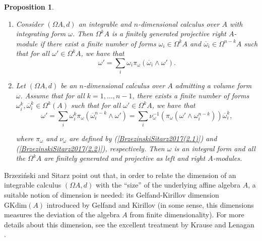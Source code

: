 \documentclass{amsart}
\newtheorem{proposition}[theorem]{Proposition}
\theoremstyle{definition}
\theoremstyle{remark}
\numberwithin{equation}{section}
\begin{document}
\begin{proposition}\label{BrzezinskiSitarz2017Lemmas2.6and2.7}
\begin{enumerate}
\item [\rm (1)] \cite[Lemma 2.6]{BrzezinskiSitarz2017} Consider $(\Omega A, d)$ an integrable and $n$-dimensional calculus over $A$ with integrating form $\omega$. Then $\Omega^{k} A$ is a finitely generated projective right $A$-module if there exist a finite number of forms $\omega_i \in \Omega^{k} A$ and $\overline{\omega}_i \in \Omega^{n-k} A$ such that for all $\omega' \in \Omega^{k} A$, we have that 
\begin{equation*}
\omega' = \sum_{i} \omega_i \pi_{\omega} (\overline{\omega}_i \wedge \omega').
\end{equation*}

\item [\rm (2)] \cite[Lemma 2.7]{BrzezinskiSitarz2017} Let $(\Omega A, d)$ be an $n$-dimensional calculus over $A$ admitting a volume form $\omega$. Assume that for all $k = 1, \ldots, n-1$, there exists a finite number of forms $\omega_{i}^{k},\overline{\omega}_{i}^{k} \in \Omega^{k}(A)$ such that for all $\omega'\in \Omega^kA$, we have that
\begin{equation*}
\omega'=\displaystyle\sum_i\omega_{i}^{k}\pi_\omega(\overline{\omega}_{i}^{n-k}\wedge\omega')=\displaystyle\sum_i\nu_{\omega}^{-1}(\pi_\omega(\omega'\wedge\omega_{i}^{n-k}))\overline{\omega}_{i}^{k},
\end{equation*}

where $\pi_{\omega}$ and $\nu_{\omega}$ are defined by {\rm (}\ref{BrzezinskiSitarz2017(2.1)}{\rm )} and {\rm (}\ref{BrzezinskiSitarz2017(2.2)}{\rm )}, respectively. Then $\omega$ is an integral form and all the $\Omega^{k}A$ are finitely generated and projective as left and right $A$-modules.
\end{enumerate}
\end{proposition}

Brzezi\'nski and Sitarz \cite[p. 421]{BrzezinskiSitarz2017} point out that, in order to relate the dimension of an integrable calculus $(\Omega A,d)$ with the ``size'' of the underlying affine algebra $A$, a suitable notion of dimension is needed: its Gelfand-Kirillov dimension $\text{GKdim}(A)$ introduced by Gelfand and Kirillov \cite{GelfandKirillov1966, GelfandKirillov1966b} (in some sense, this dimensions measures the deviation of the algebra $A$ from finite dimensionality). For more details about this dimension, see the excellent treatment by Krause and Lenagan \cite{KrauseLenagan2000}.
\end{document}
